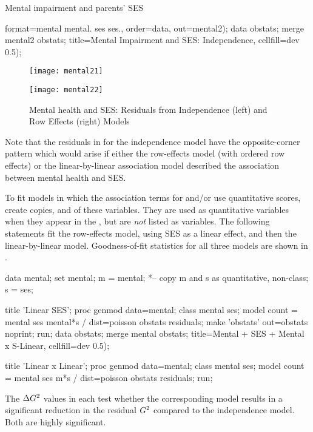 \begin{Example}[mental2]{Mental impairment and parents' SES}
\begin{listing}
       format=mental mental. ses ses., order=data, out=mental2);
data obstats;
   merge mental2 obstats;
   title=Mental Impairment and SES: Independence, cellfill=dev 0.5);
\end{listing}
\begin{figure}[htb]
 \begin{minipage}[t]{.49\linewidth}
  \texttt{[image: mental21]}
 \end{minipage}%
 \hfill
 \begin{minipage}[t]{.49\linewidth}
  \texttt{[image: mental22]}
 \end{minipage}
 \caption[Mental health and SES: Residuals]{Mental health and SES: Residuals from Independence (left) and Row Effects (right) Models}\label{fig:mental2}
\end{figure}
Note that the residuals in  for the
independence model have the opposite-corner pattern which would
arise if either the row-effects model (with ordered row effects)
or the linear-by-linear
association model described the association between mental health
and SES.


To fit models in which the association terms for  and/or
 use quantitative scores, create copies,  and
 of these variables.  They are used as quantitative variables
when they appear in the , but are \emph{not} listed
as  variables.
The following statements fit the row-effects model, using SES
as a linear effect, and then the linear-by-linear model.
Goodness-of-fit statistics for all three models are shown in
.

\begin{listing}
data mental;
   set mental;
   m = mental;    *-- copy m and s as quantitative, non-class;
   s = ses;

title 'Linear SES';
proc genmod data=mental;
   class mental ses;
   model count = mental ses mental*s / dist=poisson obstats residuals;
   make 'obstats' out=obstats noprint;
run;
data obstats;
   merge mental obstats;
   title=Mental + SES + Mental x S-Linear, cellfill=dev 0.5);

title 'Linear x Linear';
proc genmod data=mental;
   class mental ses;
   model count = mental ses m*s / dist=poisson obstats residuals;
run;
\end{listing}
The $\Delta G^2$ values in  each test whether
the corresponding model results in a significant reduction in the
residual $G^2$ compared to the independence model.  Both are
highly significant.


\end{Example}

